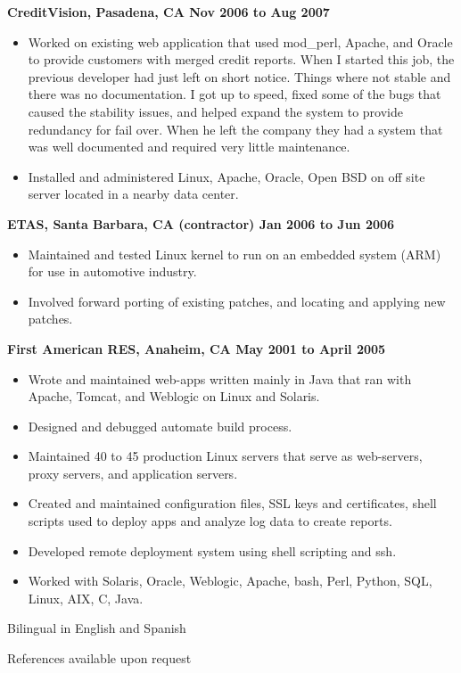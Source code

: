 \documentclass{res}
\begin{document}
\begin{resume}
{\large \bf CreditVision, Pasadena, CA \hfill Nov 2006 to Aug 2007}

\begin{itemize}

\item
	Worked on existing web application that used mod\_perl, Apache,
	and Oracle to provide customers with merged credit reports.
	When I started this job, the previous developer had just
	left on short notice.  Things where not stable and there was
	no documentation.  I got up to speed, fixed some of the bugs
	that caused the stability issues, and helped expand the system
	to provide redundancy for fail over.  When he left the company
	they had a system that was well documented and required very
	little maintenance.

\item
	Installed and administered Linux, Apache, Oracle, Open BSD on
	off site server located in a nearby data center.
\end{itemize}

{\large \bf ETAS, Santa Barbara, CA (contractor) \hfill Jan 2006 to
Jun 2006}

\begin{itemize}

\item
	Maintained and tested Linux kernel to run on an embedded system
	(ARM) for use in automotive industry.

\item
	Involved forward porting of existing patches, and locating and
	applying new patches.

\end{itemize}


{\large \bf First American RES, Anaheim, CA \hfill May 2001 to April 2005}

\begin{itemize}

\item
	Wrote and maintained web-apps written mainly in Java that ran
	with Apache, Tomcat, and Weblogic on Linux and Solaris.
\item
	Designed and debugged automate build process.
\item
	Maintained 40 to 45 production Linux servers that serve as
	web-servers, proxy servers, and application servers.
\item
	Created and maintained configuration files, SSL keys and
	certificates, shell scripts used to deploy apps and analyze log
	data to create reports.

\item
	Developed remote deployment system using shell scripting and ssh.

\item
	Worked with Solaris, Oracle, Weblogic, Apache, bash, Perl,
	Python, SQL, Linux, AIX, C, Java.

\end{itemize}

Bilingual in English and Spanish

References available upon request

\end{resume}
\end{document}
